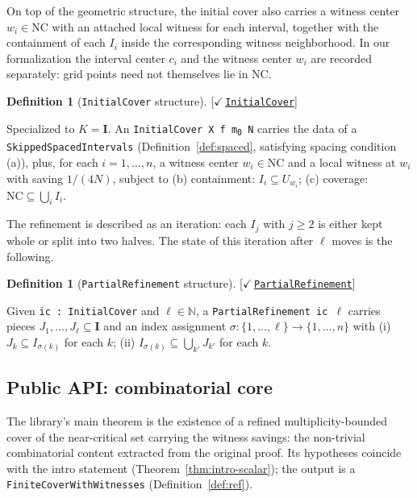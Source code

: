 \documentclass[11pt,reqno]{amsart}
\theoremstyle{definition}
\newtheorem{definition}[theorem]{Definition}
\newcommand{\unit}{\mathbf{I}}
\newcommand{\NC}{\mathrm{NC}}
\newcommand{\leanrepo}{https://github.com/MathNetwork/comb_arg/blob/v0.1.0/CombArg}
\newcommand{\leanmargin}[2]{%
  \nopagebreak\hfill{\normalfont\small\color{leangreen}%
    [\ensuremath{\checkmark}\,\href{\leanrepo/#2}{\texttt{#1}}]}\par\nopagebreak
}
\begin{document}
On top of the geometric structure, the initial cover also
carries a witness center $w_i \in \NC$ with an attached local
witness for each interval, together with the containment of
each $I_i$ inside the corresponding witness neighborhood. In our
formalization the interval center $c_i$ and the witness center
$w_i$ are recorded separately: grid points need not themselves
lie in $\NC$.

\begin{definition}[\texttt{InitialCover} structure]
\label{def:ic}
\leanmargin{InitialCover}{Refinement/InitialCover.lean}
Specialized to $K = \unit$. An
\texttt{InitialCover X f m\textsubscript{0} N} carries the data
of a \texttt{SkippedSpacedIntervals} (Definition~\ref{def:spaced},
satisfying spacing condition (a)), plus, for each
$i = 1, \ldots, n$, a witness center $w_i \in \NC$ and a local
witness at $w_i$ with saving $1/(4N)$, subject to
(b) containment: $I_i \subseteq U_{w_i}$;
(c) coverage: $\NC \subseteq \bigcup_i I_i$.
\end{definition}

The refinement is described as an iteration: each $I_j$ with
$j \ge 2$ is either kept whole or split into two halves. The
state of this iteration after $\ell$ moves is the following.

\begin{definition}[\texttt{PartialRefinement} structure]
\label{def:pr}
\leanmargin{PartialRefinement}{Refinement/PartialRefinement.lean}
Given \texttt{ic : InitialCover} and $\ell \in \mathbb{N}$, a
\texttt{PartialRefinement ic $\ell$} carries pieces
$J_1, \ldots, J_\ell \subseteq \unit$ and an index assignment
$\sigma : \{1, \ldots, \ell\} \to \{1, \ldots, n\}$ with
(i) $J_k \subseteq I_{\sigma(k)}$ for each $k$;
(ii) $I_{\sigma(k)} \subseteq \bigcup_{k'} J_{k'}$ for each $k$.
\end{definition}

\subsection{Public API: combinatorial core}
\label{sec:core-spec}

The library's main theorem is the existence of a refined
multiplicity-bounded cover of the near-critical set carrying the
witness savings: the non-trivial combinatorial content extracted
from the original proof. Its hypotheses coincide with the intro
statement (Theorem~\ref{thm:intro-scalar}); the output is a
\texttt{FiniteCoverWithWitnesses} (Definition~\ref{def:ref}).
\end{document}

